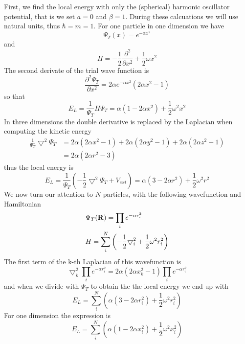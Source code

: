 \documentclass[english, a4paper]{article}
\begin{document}
\noindent First, we find the local energy with only the (spherical) harmonic oscillator potential, that is we set $a=0$ and $\beta=1$.
During these calcuations we will use natural units, thus $\hbar=m=1$.
For one particle in one dimension we have
\begin{equation}
\Psi_T(x) = e^{-\alpha x^2}
\end{equation}
and
\begin{equation}
    H =  
	 -\frac{1}{2}
	 \frac{\partial^2}{\partial x^2} +
	 \frac{1}{2}\omega x^2
\end{equation}
The second derivate of the trial wave function is
\begin{equation}
 \frac{\partial^2 \Psi_T}{\partial x^2} = 2\alpha e^{-\alpha x^2}(2\alpha x^2 - 1)
\end{equation}
so that
\begin{equation}
 E_L = \frac{1}{\Psi_T}H\Psi_T = \alpha(1 - 2\alpha x^2) + \frac{1}{2}\omega^2x^2
\end{equation}
In three dimensions the double derivative is replaced by the Laplacian when computing the kinetic energy
\begin{align}
 \frac{1}{\Psi_T}\bigtriangledown^2\Psi_T &= 2\alpha(2\alpha x^2 - 1) + 2\alpha(2\alpha y^2 - 1) + 2\alpha(2\alpha z^2 - 1) \\
                          &= 2\alpha(2\alpha r^2 - 3) \label{analytickinnoninteracing}
\end{align}
thus the local energy is
\begin{equation}
 E_L = \frac{1}{\Psi_T}\left(-\frac{1}{2}\bigtriangledown^2\Psi_T + V_{ext}\right) = \alpha(3 - 2\alpha r^2) + 
 \frac{1}{2}\omega^2r^2 
\end{equation}
We now turn our attention to $N$ particles, with the following wavefunction and Hamiltonian
\begin{align}
 &\Psi_T({\bf R}) = \prod_i e^{-\alpha r_i^2} \\ \label{wfsystem1}
 &H =     \sum_i^N \left(
	 -\frac{1}{2}
	 { \bigtriangledown }_{i}^2 +
	 \frac{1}{2}\omega^2r_i^2 \right)
\end{align}
The first term of the k-th Laplacian of this wavefunction is
\begin{equation}
 \bigtriangledown^2_k\prod_i e^{-\alpha r_i^2} = 2\alpha(2\alpha x_k^2 - 1)\prod_i e^{-\alpha r_i^2}
\end{equation}
and when we divide with $\Psi_T$ to obtain the the local energy we end up with
\begin{equation}
 E_L = \sum_i^N \left( \alpha(3 - 2\alpha r_i^2) + \frac{1}{2}\omega^2r_i^2 \right)
\end{equation}
For one dimension the expression is
\begin{equation}
 E_L = \sum_i^N \left( \alpha(1 - 2\alpha x_i^2) + \frac{1}{2}\omega^2x_i^2 \right)
\end{equation} \\
\end{document}
